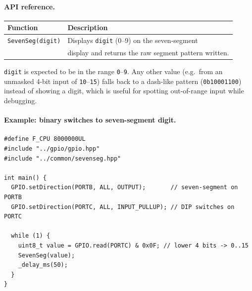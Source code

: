 \documentclass[11pt,a4paper]{article}
\begin{document}
\paragraph{API reference.}

\begin{center}
\small
\begin{tabular}{ll}
\toprule
\textbf{Function} & \textbf{Description} \\
\midrule
\texttt{SevenSeg(digit)} & Displays \texttt{digit} (0--9) on the seven-segment \\
                         & display and returns the raw segment pattern written. \\
\bottomrule
\end{tabular}
\end{center}

\texttt{digit} is expected to be in the range \texttt{0}--\texttt{9}. Any
other value (e.g.\ from an unmasked 4-bit input of \texttt{10}--\texttt{15})
falls back to a dash-like pattern (\texttt{0b10001100}) instead of showing a
digit, which is useful for spotting out-of-range input while debugging.

\paragraph{Example: binary switches to seven-segment digit.}

\begin{lstlisting}
#define F_CPU 8000000UL
#include "../gpio/gpio.hpp"
#include "../common/sevenseg.hpp"

int main() {
  GPIO.setDirection(PORTB, ALL, OUTPUT);       // seven-segment on PORTB
  GPIO.setDirection(PORTC, ALL, INPUT_PULLUP); // DIP switches on PORTC

  while (1) {
    uint8_t value = GPIO.read(PORTC) & 0x0F; // lower 4 bits -> 0..15
    SevenSeg(value);
    _delay_ms(50);
  }
}
\end{lstlisting}
\end{document}
